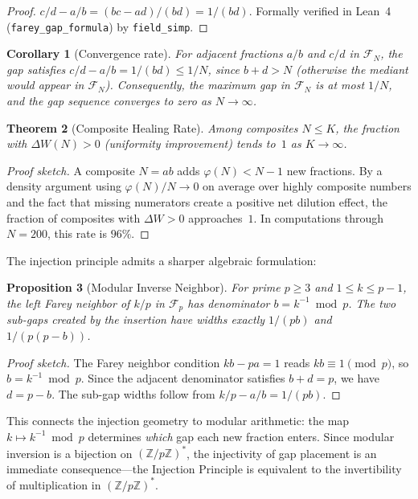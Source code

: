 \documentclass[11pt]{article}
\newtheorem{theorem}{Theorem}[section]
\newtheorem{proposition}[theorem]{Proposition}
\newtheorem{corollary}[theorem]{Corollary}
\theoremstyle{definition}
\newcommand{\Z}{\mathbb{Z}}
\newcommand{\F}{\mathcal{F}}
\begin{document}
\begin{proof}
$c/d - a/b = (bc - ad)/(bd) = 1/(bd)$.
Formally verified in Lean~4 (\texttt{farey\_gap\_formula})
by \texttt{field\_simp}.
\end{proof}

\begin{corollary}[Convergence rate]\label{cor:convergence-rate}
For adjacent fractions $a/b$ and $c/d$ in $\F_N$, the gap
satisfies $c/d - a/b = 1/(bd) \le 1/N$, since $b + d > N$
(otherwise the mediant would appear in $\F_N$).  Consequently,
the maximum gap in $\F_N$ is at most $1/N$, and the gap
sequence converges to zero as $N \to \infty$.
\end{corollary}

\begin{theorem}[Composite Healing Rate]\label{thm:healing}
Among composites $N \le K$, the fraction with
$\Delta W(N) > 0$ (uniformity improvement) tends to~$1$
as $K \to \infty$.
\end{theorem}

\begin{proof}[Proof sketch]
A composite $N = ab$ adds $\varphi(N) < N-1$ new fractions.
By a density argument using $\varphi(N)/N \to 0$ on average
over highly composite numbers and the fact that missing
numerators create a positive net dilution effect, the
fraction of composites with $\Delta W > 0$ approaches~$1$.
In computations through $N = 200$, this rate is $96\%$.
\end{proof}

The injection principle admits a sharper algebraic formulation:

\begin{proposition}[Modular Inverse Neighbor]\label{prop:mod-inv}
For prime $p \ge 3$ and $1 \le k \le p-1$, the left Farey neighbor
of $k/p$ in $\F_p$ has denominator $b = k^{-1} \bmod p$.  The two
sub-gaps created by the insertion have widths exactly $1/(pb)$ and
$1/(p(p-b))$.
\end{proposition}

\begin{proof}[Proof sketch]
The Farey neighbor condition $kb - pa = 1$ reads $kb \equiv 1 \pmod{p}$,
so $b = k^{-1} \bmod p$.  Since the adjacent denominator satisfies
$b + d = p$, we have $d = p - b$.  The sub-gap widths follow from
$k/p - a/b = 1/(pb)$.
\end{proof}

\noindent This connects the injection geometry to modular arithmetic:
the map $k \mapsto k^{-1} \bmod p$ determines \emph{which} gap
each new fraction enters.  Since modular inversion is a bijection
on $(\Z/p\Z)^*$, the injectivity of gap placement is an immediate
consequence---the Injection Principle is equivalent to the
invertibility of multiplication in $(\Z/p\Z)^*$.
\end{document}
